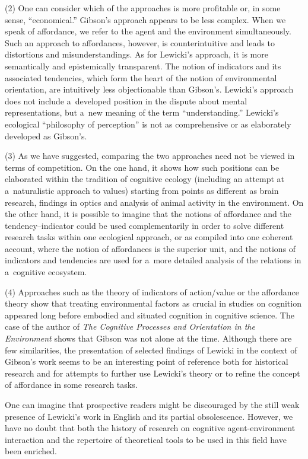 \documentclass[%
manuscript=article,
year=2024,
volume=77,
doi=10.59203/zfn.77.693,
]{zfn}
\begin{document}
(2) One can consider which of the approaches is more profitable or, in some sense, ``economical.'' Gibson's approach appears to be less complex. When we speak of affordance, we refer to the agent and the environment simultaneously. Such an approach to affordances, however, is counterintuitive and leads to distortions and misunderstandings. As for Lewicki's approach, it is more semantically and epistemically transparent. The notion of indicators and its associated tendencies, which form the heart of the notion of environmental orientation, are intuitively less objectionable than Gibson's. Lewicki's approach does not include a~developed position in the dispute about mental representations, but a~new meaning of the term ``understanding.'' Lewicki's ecological ``philosophy of perception'' is not as comprehensive or as elaborately developed as Gibson's.



(3) As we have suggested, comparing the two approaches need not be viewed in terms of competition. On the one hand, it shows how such positions can be elaborated within the tradition of cognitive ecology (including an attempt at a~naturalistic approach to values) starting from points as different as brain research, findings in optics and analysis of animal activity in the environment. On the other hand, it is possible to imagine that the notions of affordance and the tendency–indicator could be used complementarily in order to solve different research tasks within one ecological approach, or as compiled into one coherent account, where the notion of affordances is the superior unit, and the notions of indicators and tendencies are used for a~more detailed analysis of the relations in a~cognitive ecosystem.



(4) Approaches such as the theory of indicators of action/value or the affordance theory show that treating environmental factors as crucial in studies on cognition appeared long before embodied and situated cognition in cognitive science. The case of the author of \textit{The Cognitive Processes and Orientation in the Environment} shows that Gibson was not alone at the time. Although there are few similarities, the presentation of selected findings of Lewicki in the context of Gibson's work seems to be an interesting point of reference both for historical research and for attempts to further use Lewicki's theory or to refine the concept of affordance in some research tasks.



One can imagine that prospective readers might be discouraged by the still weak presence of Lewicki's work in English and its partial obsolescence. However, we have no doubt that both the history of research on cognitive agent-environment interaction and the repertoire of theoretical tools to be used in this field have been enriched.




\printbibliography
\end{document}
